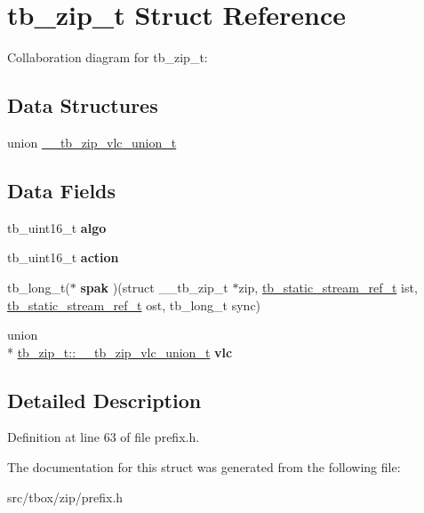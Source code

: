 \hypertarget{structtb__zip__t}{\section{tb\-\_\-zip\-\_\-t Struct Reference}
\label{structtb__zip__t}
}


Collaboration diagram for tb\-\_\-zip\-\_\-t\-:
\subsection*{Data Structures}
\begin{DoxyCompactItemize}
\item 
union \hyperlink{uniontb__zip__t_1_1____tb__zip__vlc__union__t}{\-\_\-\-\_\-tb\-\_\-zip\-\_\-vlc\-\_\-union\-\_\-t}
\end{DoxyCompactItemize}
\subsection*{Data Fields}
\begin{DoxyCompactItemize}
\item 
\hypertarget{structtb__zip__t_a043167875ee332784402c8cbf717a40a}{tb\-\_\-uint16\-\_\-t {\bfseries algo}}\label{structtb__zip__t_a043167875ee332784402c8cbf717a40a}

\item 
\hypertarget{structtb__zip__t_a01a7dc02672e45458fd595bccb82c3fc}{tb\-\_\-uint16\-\_\-t {\bfseries action}}\label{structtb__zip__t_a01a7dc02672e45458fd595bccb82c3fc}

\item 
\hypertarget{structtb__zip__t_a011d1b24ea2af3313b84c3989bc0737a}{tb\-\_\-long\-\_\-t($\ast$ {\bfseries spak} )(struct \-\_\-\-\_\-tb\-\_\-zip\-\_\-t $\ast$zip, \hyperlink{static__stream_8h_a6f19ed215d23e2708f134474b87d281a}{tb\-\_\-static\-\_\-stream\-\_\-ref\-\_\-t} ist, \hyperlink{static__stream_8h_a6f19ed215d23e2708f134474b87d281a}{tb\-\_\-static\-\_\-stream\-\_\-ref\-\_\-t} ost, tb\-\_\-long\-\_\-t sync)}\label{structtb__zip__t_a011d1b24ea2af3313b84c3989bc0737a}

\item 
\hypertarget{structtb__zip__t_a2f0a813bb0c832776ae8d7feb756dc40}{union \\*
\hyperlink{uniontb__zip__t_1_1____tb__zip__vlc__union__t}{tb\-\_\-zip\-\_\-t\-::\-\_\-\-\_\-tb\-\_\-zip\-\_\-vlc\-\_\-union\-\_\-t} {\bfseries vlc}}\label{structtb__zip__t_a2f0a813bb0c832776ae8d7feb756dc40}

\end{DoxyCompactItemize}


\subsection{Detailed Description}


Definition at line 63 of file prefix.\-h.



The documentation for this struct was generated from the following file\-:\begin{DoxyCompactItemize}
\item 
src/tbox/zip/prefix.\-h\end{DoxyCompactItemize}
